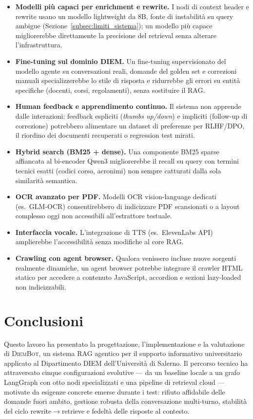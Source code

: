 \documentclass[11pt,a4paper]{article}
\newcommand{\sys}{\textsc{DiemBot}}
\begin{document}
\begin{itemize}
  \item \textbf{Modelli più capaci per enrichment e rewrite.} I nodi di context header e
    rewrite usano un modello lightweight da 8B, fonte di instabilità su query ambigue
    (Sezione~\ref{subsec:limiti_sistema}); un modello più capace migliorerebbe
    direttamente la precisione del retrieval senza alterare l'infrastruttura.
  \item \textbf{Fine-tuning sul dominio DIEM.} Un fine-tuning supervisionato del modello
    agente su conversazioni reali, domande del golden set e correzioni manuali
    specializzerebbe lo stile di risposta e ridurrebbe gli errori su entità specifiche
    (docenti, corsi, regolamenti), senza sostituire il RAG.
  \item \textbf{Human feedback e apprendimento continuo.} Il sistema non apprende dalle
    interazioni: feedback espliciti (\emph{thumbs up/down}) e impliciti (follow-up di
    correzione) potrebbero alimentare un dataset di preferenze per RLHF/DPO, il
    riordino dei documenti recuperati o regression test mirati.
  \item \textbf{Hybrid search (BM25 + dense).} Una componente BM25 sparse affiancata al
    bi-encoder Qwen3 migliorerebbe il recall su query con termini tecnici esatti (codici
    corso, acronimi) non sempre catturati dalla sola similarità semantica.
  \item \textbf{OCR avanzato per PDF.} Modelli OCR vision-language dedicati (es.\
    GLM-OCR) consentirebbero di indicizzare PDF scansionati o a layout complesso oggi
    non accessibili all'estrattore testuale.
  \item \textbf{Interfaccia vocale.} L'integrazione di TTS (es.\ ElevenLabs API)
    amplierebbe l'accessibilità senza modifiche al core RAG.
  \item \textbf{Crawling con agent browser.} Qualora venissero incluse nuove sorgenti
    realmente dinamiche, un agent browser potrebbe integrare il crawler HTML statico per
    accedere a contenuto JavaScript, accordion e sezioni lazy-loaded non indicizzabili.
\end{itemize}

\section{Conclusioni}
\label{sec:conclusioni}

Questo lavoro ha presentato la progettazione, l'implementazione e la valutazione di
\sys{}, un sistema RAG agentico per il supporto informativo universitario applicato al
Dipartimento DIEM dell'Università di Salerno. Il percorso tecnico ha attraversato cinque
configurazioni evolutive --- da un baseline locale a un grafo LangGraph con otto nodi
specializzati e una pipeline di retrieval cloud --- motivate da esigenze concrete emerse
durante i test: rifiuto affidabile delle domande fuori ambito, gestione robusta della
conversazione multi-turno, stabilità del ciclo rewrite$\to$retrieve e fedeltà delle
risposte al contesto.
\end{document}
